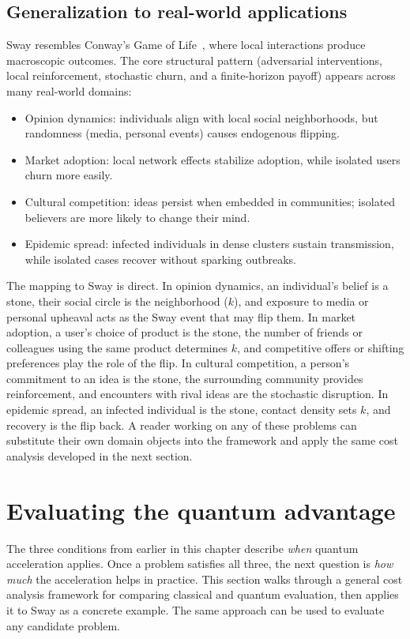 \subsection{Generalization to real-world applications}

Sway resembles Conway's Game of Life~\cite{gardner1970}, where local interactions produce macroscopic outcomes.
The core structural pattern (adversarial interventions, local reinforcement, stochastic churn, and a finite-horizon payoff) appears across many real-world domains:

\begin{itemize}
  \item Opinion dynamics: individuals align with local social neighborhoods, but randomness (media, personal events) causes endogenous flipping.
  \item Market adoption: local network effects stabilize adoption, while isolated users churn more easily.
  \item Cultural competition: ideas persist when embedded in communities; isolated believers are more likely to change their mind.
  \item Epidemic spread: infected individuals in dense clusters sustain transmission, while isolated cases recover without sparking outbreaks.
\end{itemize}

The mapping to Sway is direct.
In opinion dynamics, an individual's belief is a stone, their social circle is the neighborhood ($k$), and exposure to media or personal upheaval acts as the Sway event that may flip them.
In market adoption, a user's choice of product is the stone, the number of friends or colleagues using the same product determines $k$, and competitive offers or shifting preferences play the role of the flip.
In cultural competition, a person's commitment to an idea is the stone, the surrounding community provides reinforcement, and encounters with rival ideas are the stochastic disruption.
In epidemic spread, an infected individual is the stone, contact density sets $k$, and recovery is the flip back.
A reader working on any of these problems can substitute their own domain objects into the framework and apply the same cost analysis developed in the next section.

\section{Evaluating the quantum advantage}

The three conditions from earlier in this chapter describe \emph{when} quantum acceleration applies.
Once a problem satisfies all three, the next question is \emph{how much} the acceleration helps in practice.
This section walks through a general cost analysis framework for comparing classical and quantum evaluation, then applies it to Sway as a concrete example.
The same approach can be used to evaluate any candidate problem.

